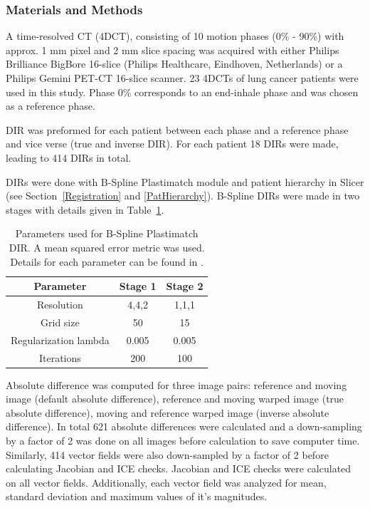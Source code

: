 \documentclass[type=dr, dr=rernat, accentcolor=tud7b,colorbacktitle, bigchapter, openright, twoside, 12pt ]{tudthesis}
\begin{document}
\subsubsection{Materials and Methods}

A time-resolved CT (4DCT), consisting of 10 motion phases (0\% - 90\%) with approx. 1 mm pixel and 2 mm slice spacing was acquired with either Philips Brilliance BigBore 16-slice (Philips Healthcare, Eindhoven, Netherlands) or a Philips Gemini PET-CT 16-slice scanner. 23 4DCTs of lung cancer patients were used in this study.
Phase 0\% corresponds to an end-inhale phase and was chosen as a reference phase.

DIR was preformed for each patient between each phase and a reference phase and vice verse (true and inverse DIR). For each patient 18 DIRs were made, leading to 414 DIRs in total.

DIRs were done with B-Spline Plastimatch module and patient hierarchy in Slicer (see Section~\ref{Registration} and \ref{PatHierarchy}). B-Spline DIRs were made in two stages with details given in Table~\ref{tab:stages}. 

\begin{table}[H]
  \centering
  \caption{Parameters used for B-Spline Plastimatch DIR. A mean squared error metric was used. Details for each parameter can be found in \cite{Plastimatch}.}
  \begin{tabular}{c|c|c}
      Parameter & Stage 1 & Stage 2 \\
      \hline
      Resolution & 4,4,2 & 1,1,1 \\
      Grid size & 50 & 15 \\
      Regularization lambda & 0.005 & 0.005 \\
      Iterations & 200 & 100 \\
    \hline\hline
  \end{tabular}
  \label{tab:stages}
\end{table}

Absolute difference was computed for three image pairs: reference and moving image (default absolute difference), reference and moving warped image (true absolute difference), moving and reference warped image (inverse absolute difference). In total 621 absolute differences were calculated and a down-sampling by a factor of 2 was
done on all images before calculation to save computer time. Similarly, 414 vector fields were also down-sampled by a factor of 2 before calculating Jacobian and ICE checks. Jacobian and ICE checks were calculated on all vector fields. Additionally, each vector field was analyzed for mean, standard deviation and maximum values of it's magnitudes.
\end{document}
